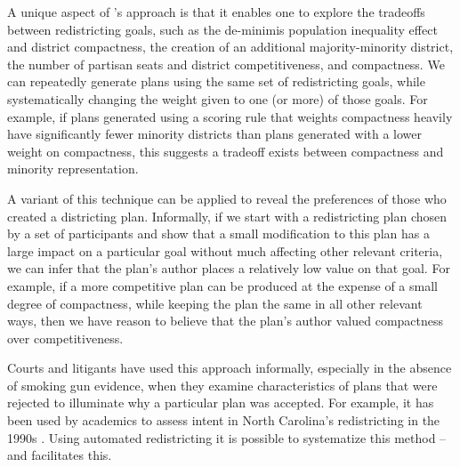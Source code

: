 \documentclass[article]{JSSstyle/jss}
\begin{document}
A unique aspect of 's approach is that it enables
one to explore the tradeoffs between redistricting goals, such as the
de-minimis population inequality effect and district
compactness, the creation of an additional majority-minority
district, the number of partisan seats and district
competitiveness, and compactness. We can repeatedly
generate plans using the same set of redistricting goals,
while systematically changing the weight given to
one (or more) of those goals. For example, if plans generated
using a scoring rule that weights compactness heavily have
significantly fewer minority districts than plans generated with a
lower weight on compactness, this suggests a tradeoff exists
between compactness and minority representation.

A variant of this technique can be applied to reveal the
preferences of those who created a districting plan. Informally, if we
start with a redistricting plan chosen by a set of participants and
show that a small modification to this plan has a large impact on 
a particular goal without much affecting other relevant criteria, we can infer that the plan's author places a relatively low
value on that goal. For example, if a more competitive plan can be produced at the expense
of a small degree of compactness, while keeping the plan the same in all other
relevant ways, then we have reason to believe that the plan's author 
valued compactness over competitiveness. 

Courts and litigants have used this approach informally, especially in the
absence of smoking gun evidence, when they examine characteristics of
plans that were rejected to illuminate why a particular plan was
accepted. For example, it has been used by academics to assess
intent in North Carolina's redistricting in the 1990s \citep[][]{GronWil99}. Using automated redistricting it is possible to
systematize this method -- and  facilitates this. 
\end{document}
